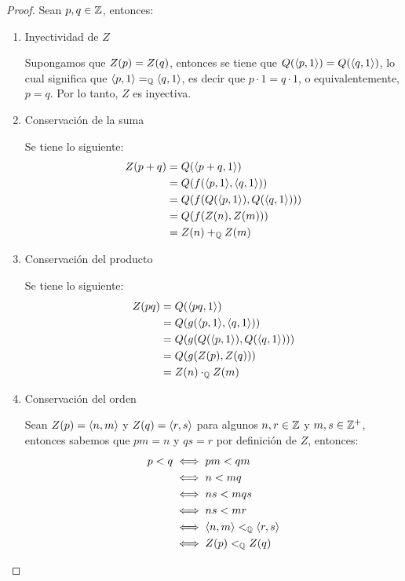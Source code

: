 \begin{proof}
	Sean $p, q\in\ZZ$, entonces:

	\begin{enumerate}
		\item Inyectividad de $Z$

		Supongamos que $Z\pa*{p} = Z\pa*{q}$, entonces se tiene que $Q\pa*{\inner*{p, 1}} = Q\pa*{\inner*{q, 1}}$, lo cual significa que $\inner*{p, 1} =_{\QQ}\inner*{q, 1}$, es decir que $p\cdot 1 = q\cdot 1$, o equivalentemente, $p = q$. Por lo tanto, $Z$ es inyectiva.

		\item Conservación de la suma

		Se tiene lo siguiente:
		\begin{align*}
			Z\pa*{p + q} &= Q\pa*{\inner*{p + q, 1}}\\
			&= Q\pa*{f\pa*{\inner*{p, 1},\inner*{q, 1}}}\\
			&= Q\pa*{f\pa*{Q\pa*{\inner*{p, 1}}, Q\pa*{\inner*{q, 1}}}}\\
			&= Q\pa*{f\pa*{Z\pa*{n}, Z\pa*{m}}}\\
			&= Z\pa*{n} +_{\QQ} Z\pa*{m}
		\end{align*}

		\item Conservación del producto

		Se tiene lo siguiente:
		\begin{align*}
			Z\pa*{pq} &= Q\pa*{\inner*{pq, 1}}\\
			&= Q\pa*{g\pa*{\inner*{p, 1},\inner*{q, 1}}}\\
			&= Q\pa*{g\pa*{Q\pa*{\inner*{p, 1}}, Q\pa*{\inner*{q, 1}}}}\\
			&= Q\pa*{g\pa*{Z\pa*{p}, Z\pa*{q}}}\\
			&= Z\pa*{n}\cdot_{\QQ} Z\pa*{m}
		\end{align*}

		\item Conservación del orden

		Sean $Z\pa*{p} =\inner*{n, m}$ y $Z\pa*{q} =\inner*{r, s}$ para algunos $n, r\in\ZZ$ y $m, s\in\ZZ^{+}$, entonces sabemos que $pm = n$ y $qs = r$ por definición de $Z$, entonces:
		\begin{align*}
			p < q &\iff pm < qm\\
			&\iff n < mq\\
			&\iff ns < mqs\\
			&\iff ns < mr\\
			&\iff\inner*{n, m} <_{\QQ}\inner*{r, s}\\
			&\iff Z\pa*{p} <_{\QQ} Z\pa*{q}
		\end{align*}
	\end{enumerate}
\end{proof}

